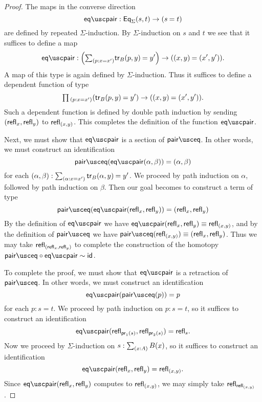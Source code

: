 \begin{proof}
The maps in the converse direction
\begin{equation*}
\eqpair : \EqSigma(s,t)\to(\id{s}{t})
\end{equation*}
are defined by repeated $\Sigma$-induction. By $\Sigma$-induction on $s$ and $t$  we see that it suffices to define a map
\begin{equation*}
\eqpair : \Big(\sm{p:x=x'}\id{\tr_B(p,y)}{y'}\Big)\to(\id{(x,y)}{(x',y')}).
\end{equation*}
A map of this type is again defined by $\Sigma$-induction. Thus it suffices to define a dependent function of type
\begin{equation*}
\prd{p:x=x'} (\id{\tr_B(p,y)}{y'}) \to (\id{(x,y)}{(x',y')}).
\end{equation*}
Such a dependent function is defined by double path induction by sending ${\mathopen{}(\mathsf{refl}_{x},\mathsf{refl}_{y})\mathclose{}}$ to $\mathsf{refl}_{{\mathopen{}(x,y)\mathclose{}}}$. This completes the definition of the function $\eqpair$.

Next, we must show that $\eqpair$ is a section of $\paireq$. In other words, we must construct an identification
\begin{equation*}
\paireq(\eqpair(\alpha,\beta))=\pairr{\alpha,\beta}
\end{equation*}
for each $\pairr{\alpha,\beta}:\sm{\alpha:x=x'}\id{\tr_B(\alpha,y)}{y'}$. We proceed by path induction on $\alpha$, followed by path induction on $\beta$. Then our goal becomes to construct a term of type
\begin{equation*}
\paireq(\eqpair\pairr{\refl{x},\refl{y}})=\pairr{\refl{x},\refl{y}}
\end{equation*}
By the definition of $\eqpair$ we have $\eqpair\pairr{\refl{x},\refl{y}}\jdeq \refl{\pairr{x,y}}$, and by the definition of $\paireq$ we have $\paireq(\refl{\pairr{x,y}})\jdeq\pairr{\refl{x},\refl{y}}$. Thus we may take $\mathsf{refl}_{{\mathopen{}(\mathsf{refl}_{x},\mathsf{refl}_{y})\mathclose{}}}$ to complete the construction of the homotopy $\paireq\circ\eqpair\htpy\idfunc$.

To complete the proof, we must show that $\eqpair$ is a retraction of $\paireq$. In other words, we must construct an identification
\begin{equation*}
\eqpair(\paireq(p))=p
\end{equation*}
for each $p:s=t$. We proceed by path induction on $p:s=t$, so it suffices to construct an identification 
\begin{equation*}
\eqpair\pairr{\refl{\proj 1(s)},\refl{\proj 2(s)}}=\refl{s}.
\end{equation*}
Now we proceed by $\Sigma$-induction on $s:\sm{x:A}B(x)$, so it suffices to construct an identification
\begin{equation*}
\eqpair\pairr{\refl{x},\refl{y}}=\refl{(x,y)}.
\end{equation*}
Since $\eqpair\pairr{\refl{x},\refl{y}}$ computes to $\mathsf{refl}_{(x,y)}$, we may simply take $\mathsf{refl}_{\mathsf{refl}_{(x,y)}}$.
\end{proof}

